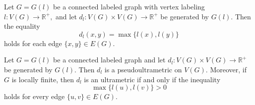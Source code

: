 \documentclass[10pt,a4paper]{amsart}
\begin{document}
\begin{Corollary}\label{btoy} Let $G = G(l)$ be a connected labeled graph with  vertex labeling $l : V(G) \to \mathbb R^+,$ and let $d_l : V(G)\times V(G)\to \mathbb R^+$ be generated by $G(l)$. Then the equality
\begin{equation}
    \label{a1}
d_l(x,y)
= \max \{ l(x), l(y) \}
\end{equation}
holds for each edge $ \{x,y\} \in E(G)$.
\end{Corollary}

\begin{Theorem}\label{tteo5} Let $G = G(l)$ be a connected  labeled graph  and let  $d_l : V(G)\times V(G) \to \mathbb{R}^{+}$
be generated by $G(l)$.
Then $d_l$ is  a pseudoultrametric on $V(G)$. Moreover, if $G$ is locally finite, then $d_l$ is an ultrametric if and only if the inequality
\begin{equation}\label{eq:10}
\max\{l(u),l(v)\} > 0
\end{equation}
holds for every edge $\{u,v\} \in E(G)$.
\end{Theorem}
\end{document}
